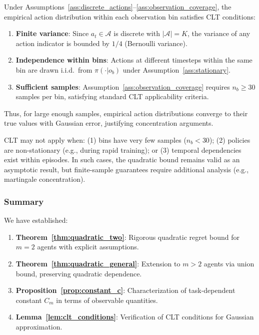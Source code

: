 \begin{lemma}
\label{lem:clt_conditions}
Under Assumptions~\ref{ass:discrete_actions}--\ref{ass:observation_coverage}, the empirical action distribution within each observation bin satisfies CLT conditions:
\begin{enumerate}
    \item \textbf{Finite variance}: Since $a_t \in \mathcal{A}$ is discrete with $|\mathcal{A}| = K$, the variance of any action indicator is bounded by $1/4$ (Bernoulli variance).
    \item \textbf{Independence within bins}: Actions at different timesteps within the same bin are drawn i.i.d.\ from $\pi(\cdot|o_b)$ under Assumption~\ref{ass:stationary}.
    \item \textbf{Sufficient samples}: Assumption~\ref{ass:observation_coverage} requires $n_b \geq 30$ samples per bin, satisfying standard CLT applicability criteria.
\end{enumerate}
Thus, for large enough samples, empirical action distributions converge to their true values with Gaussian error, justifying concentration arguments.
\end{lemma}

\begin{remark}
CLT may not apply when: (1) bins have very few samples ($n_b < 30$); (2) policies are non-stationary (e.g., during rapid training); or (3) temporal dependencies exist within episodes. In such cases, the quadratic bound remains valid as an asymptotic result, but finite-sample guarantees require additional analysis (e.g., martingale concentration).
\end{remark}

\subsubsection{Summary}

We have established:
\begin{enumerate}
    \item \textbf{Theorem~\ref{thm:quadratic_two}}: Rigorous quadratic regret bound for $m = 2$ agents with explicit assumptions.
    \item \textbf{Theorem~\ref{thm:quadratic_general}}: Extension to $m > 2$ agents via union bound, preserving quadratic dependence.
    \item \textbf{Proposition~\ref{prop:constant_c}}: Characterization of task-dependent constant $C_m$ in terms of observable quantities.
    \item \textbf{Lemma~\ref{lem:clt_conditions}}: Verification of CLT conditions for Gaussian approximation.
\end{enumerate}

